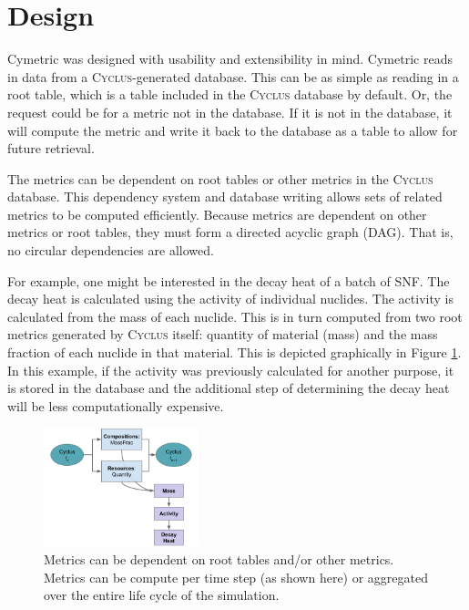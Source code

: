 \documentclass{anstrans}
\newcommand{\cyclus}{\textsc{Cyclus}\xspace}
\begin{document}
\section{Design}
Cymetric was designed with usability and extensibility in mind. 
Cymetric reads in data from a \cyclus{}-generated database. This can be as 
simple as reading in a root table, which is a table included in the \cyclus 
database by default. Or, the request could be for a metric not in the database.
If it is not in the database, it will compute the metric and 
write it back to the database as a table to allow for future retrieval. 

The metrics can be dependent on root tables or other metrics in the
\cyclus database. This dependency system and database writing allows sets of 
related metrics to be computed efficiently. Because metrics are dependent 
on other metrics or root tables, they must form a directed 
acyclic graph (DAG). That is, no circular dependencies are allowed.

For example, one might be interested in the decay heat 
of a batch of \gls{SNF}. The decay heat is calculated using the activity of 
individual nuclides. The activity is calculated from the mass of each nuclide.
This is in turn computed from two root metrics generated by 
\cyclus itself: quantity of material (mass) and the mass fraction of each 
nuclide in that material. This is depicted graphically in Figure \ref{fig:metdeps}. 
In this example, if the activity was previously calculated for another purpose, 
it is stored in the database and the additional step of determining the decay heat 
will be less computationally expensive. 

\begin{figure}[htbp!]
\begin{centering}
\includegraphics[width=0.4\textwidth]{deps.pdf}
\end{centering}
\caption{Metrics can be dependent on root tables and/or other metrics.
         Metrics can be compute per time step (as shown here) or aggregated
         over the entire life cycle of the simulation.}
\label{fig:metdeps}
\end{figure}
\end{document}
